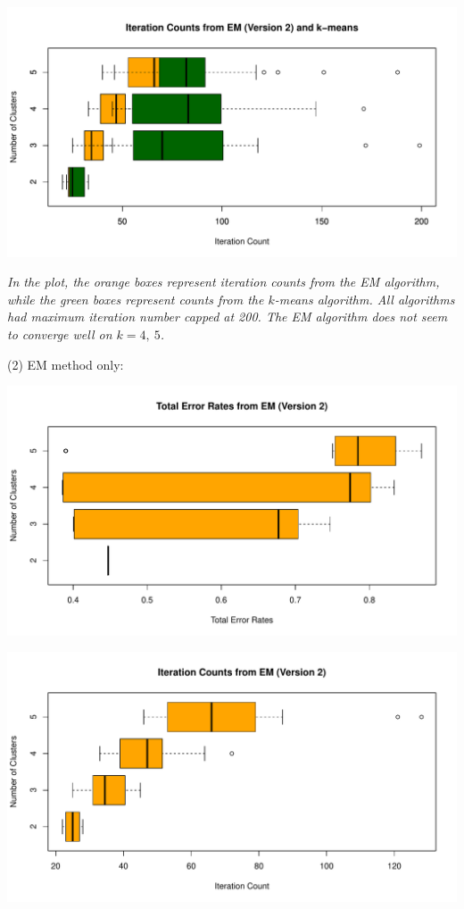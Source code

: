 \documentclass[a4paper,12pt]{article}
\begin{document}
\begin{center}
  \includegraphics[width=0.9\linewidth]{Image/Prob3-2-ItrCount-Ringnorm-Both.pdf}
  
   \parbox{0.9\textwidth}{\textit{In the plot, the \textcolor{myorange}{orange boxes} represent iteration counts from the EM algorithm, while the \textcolor{mydarkgreen}{green boxes} represent counts from the $k$-means algorithm. 
   All algorithms had maximum iteration number capped at 200. The EM algorithm does not seem to converge well on $k = 4,\ 5$.
  }}
\end{center}
\bigskip

\noindent (2) EM method only:
\begin{center}
  \includegraphics[width=0.8\linewidth]{Image/Prob3-2-TotalErr-Ringnorm-EMFixed.pdf}
\end{center}
\begin{center}
  \includegraphics[width=0.8\linewidth]{Image/Prob3-2-ItrCount-Ringnorm-EMFixed.pdf}
\end{center}
\bigskip
\end{document}
